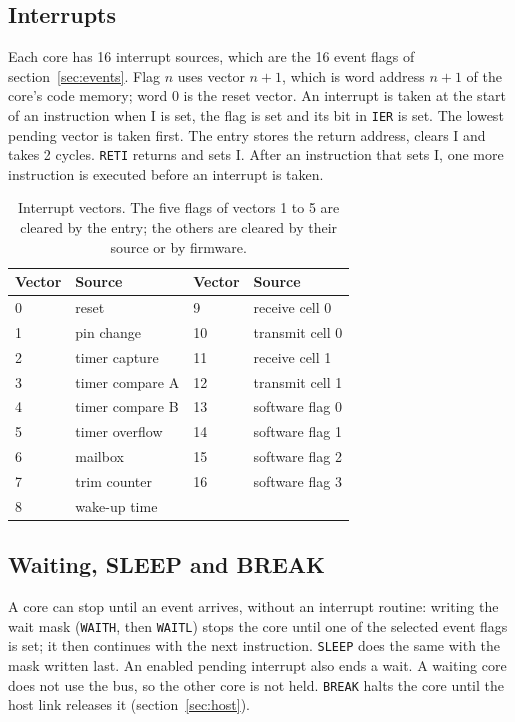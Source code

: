 \documentclass[10pt,a4paper]{article}
\newcommand{\reg}[1]{\texttt{#1}}
\begin{document}
\subsection{Interrupts}

Each core has 16 interrupt sources, which are the 16 event flags of section~\ref{sec:events}. Flag $n$ uses vector
$n+1$, which is word address $n+1$ of the core's code memory; word 0 is the reset vector. An interrupt is taken
at the start of an instruction when I is set, the flag is set and its bit in \reg{IER} is set. The lowest
pending vector is taken first. The entry stores the return address, clears I and takes 2 cycles. \texttt{RETI}
returns and sets I. After an instruction that sets I, one more instruction is executed before an interrupt is
taken.

\begin{table}[H]
\centering\small
\begin{tabular}{@{}llll@{}}
\toprule
Vector & Source & Vector & Source \\
\midrule
0 & reset & 9 & receive cell 0 \\
1 & pin change & 10 & transmit cell 0 \\
2 & timer capture & 11 & receive cell 1 \\
3 & timer compare A & 12 & transmit cell 1 \\
4 & timer compare B & 13 & software flag 0 \\
5 & timer overflow & 14 & software flag 1 \\
6 & mailbox & 15 & software flag 2 \\
7 & trim counter & 16 & software flag 3 \\
8 & wake-up time & & \\
\bottomrule
\end{tabular}
\caption{Interrupt vectors. The five flags of vectors 1 to 5 are cleared by the entry; the others are cleared by
their source or by firmware.}
\end{table}

\subsection{Waiting, SLEEP and BREAK}

A core can stop until an event arrives, without an interrupt routine: writing the wait mask (\reg{WAITH}, then
\reg{WAITL}) stops the core until one of the selected event flags is set; it then continues with the next
instruction. \texttt{SLEEP} does the same with the mask written last. An enabled pending interrupt also ends a wait.
A waiting core does not use the bus, so the other core is not held. \texttt{BREAK} halts the core until the host
link releases it (section~\ref{sec:host}).
\end{document}
